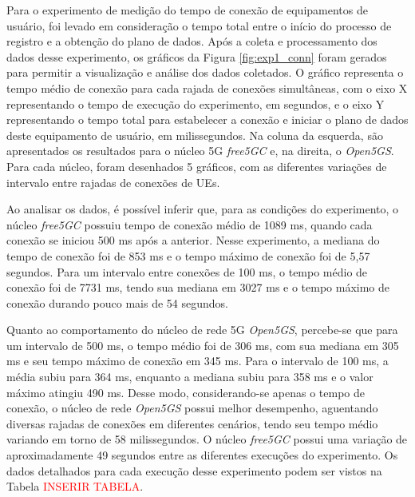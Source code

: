 Para o experimento de medição do tempo de conexão de equipamentos de usuário, foi levado em consideração o tempo total entre o início do processo de registro e a obtenção do plano de dados. Após a coleta e processamento dos dados desse experimento, os gráficos da Figura \ref{fig:exp1_conn} foram gerados para permitir a visualização e análise dos dados coletados.
O gráfico representa o tempo médio de conexão para cada rajada de conexões simultâneas, com o eixo X representando o tempo de execução do experimento, em segundos, e o eixo Y representando o tempo total para estabelecer a conexão e iniciar o plano de dados deste equipamento de usuário, em milissegundos.
Na coluna da esquerda, são apresentados os resultados para o núcleo 5G \textit{free5GC} e, na direita, o \textit{Open5GS}. Para cada núcleo, foram desenhados 5 gráficos, com as diferentes variações de intervalo entre rajadas de conexões de UEs.

Ao analisar os dados, é possível inferir que, para as condições do experimento, o núcleo \textit{free5GC} possuiu tempo de conexão médio de 1089 ms, quando cada conexão se iniciou 500 ms após a anterior.
Nesse experimento, a mediana do tempo de conexão foi de 853 ms e o tempo máximo de conexão foi de 5,57 segundos.
Para um intervalo entre conexões de 100 ms, o tempo médio de conexão foi de 7731 ms, tendo sua mediana em 3027 ms e o tempo máximo de conexão durando pouco mais de 54 segundos.

Quanto ao comportamento do núcleo de rede 5G \textit{Open5GS}, percebe-se que para um intervalo de 500 ms, o tempo médio foi de 306 ms, com sua mediana em 305 ms e seu tempo máximo de conexão em 345 ms.
Para o intervalo de 100 ms, a média subiu para 364 ms, enquanto a mediana subiu para 358 ms e o valor máximo atingiu 490 ms.
Desse modo, considerando-se apenas o tempo de conexão, o núcleo de rede \textit{Open5GS} possui melhor desempenho, aguentando diversas rajadas de conexões em diferentes cenários, tendo seu tempo médio variando em torno de 58 milissegundos. O núcleo \textit{free5GC} possui uma variação de aproximadamente 49 segundos entre as diferentes execuções do experimento.
Os dados detalhados para cada execução desse experimento podem ser vistos na Tabela \textcolor{red}{INSERIR TABELA}.

